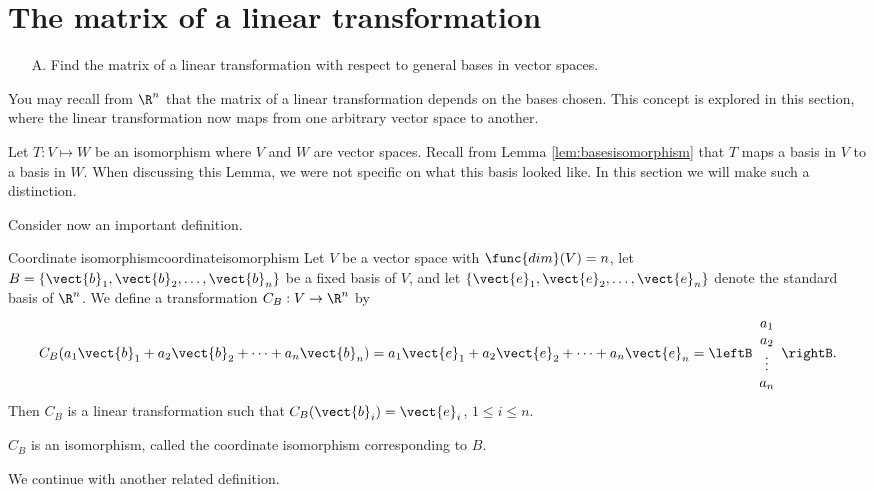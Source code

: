\section{The matrix of a linear transformation}

\begin{outcome}

\begin{enumerate}

\item[A.] Find the matrix of a linear transformation with respect to general bases in vector spaces. 

\end{enumerate}
\end{outcome}

You may recall from $\R^n$ that the matrix of a linear transformation depends on the bases chosen. This concept is explored in this section, where the linear transformation now maps from one arbitrary vector space to another. 

Let $T: V \mapsto W$ be an isomorphism where $V$ and $W$ are vector spaces. Recall from Lemma \ref{lem:basesisomorphism} that $T$ maps a basis in $V$ to a basis in $W$. When discussing this Lemma, we were not specific on what this basis looked like. In this section we will make such a distinction. 

Consider now an important definition.

\begin{definition}{Coordinate isomorphism}{coordinateisomorphism}
Let $V$ be a vector space with $\func{dim}(V)=n$, let $B=\{ \vect{b}_1, \vect{b}_2, \ldots, \vect{b}_n \}$ be a fixed basis of $V$,
and let $\{ \vect{e}_1, \vect{e}_2, \ldots, \vect{e}_n \}$
denote the standard basis of $\R^n$.
We define a transformation $C_B:V\to\R^n$ by
\[
C_B(a_1\vect{b}_1 + a_2\vect{b}_2 + \cdots + a_n\vect{b}_n)
=
a_1\vect{e}_1 + a_2\vect{e}_2 + \cdots + a_n\vect{e}_n
=
\leftB\begin{array}{c} a_1 \\ a_2 \\ \vdots \\ a_n
\end{array}\rightB.\]
Then $C_B$ is a linear transformation
such that
$C_B(\vect{b}_i)=\vect{e}_i$, $1\leq i\leq n$.

$C_B$ is an isomorphism, called
the coordinate isomorphism corresponding to $B$.
\end{definition}

We continue with another related definition.

